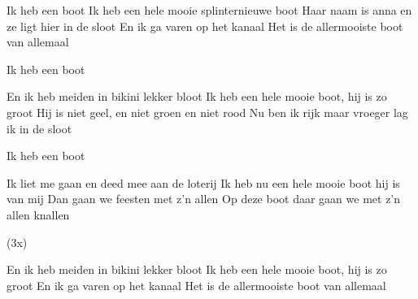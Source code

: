 
\begin{guitar}
	Ik heb een boot
	Ik heb een hele mooie splinternieuwe boot
	Haar naam is anna en ze ligt hier in de sloot
	En ik ga varen op het kanaal
	Het is de allermooiste boot van allemaal

	Ik heb een boot
	 

	En ik heb meiden in bikini lekker bloot
	Ik heb een hele mooie boot, hij is zo groot
	Hij is niet geel, en niet groen en niet rood
	Nu ben ik rijk maar vroeger lag ik in de sloot

	 
	Ik heb een boot
	 

	Ik liet me gaan en deed mee aan de loterij
	Ik heb nu een hele mooie boot hij is van mij
	Dan gaan we feesten met z'n allen
	Op deze boot daar gaan we met z'n allen knallen

   (3x) 

	En ik heb meiden in bikini lekker bloot
	Ik heb een hele mooie boot, hij is zo groot
	En ik ga varen op het kanaal
	Het is de allermooiste boot van allemaal
\end{guitar}

